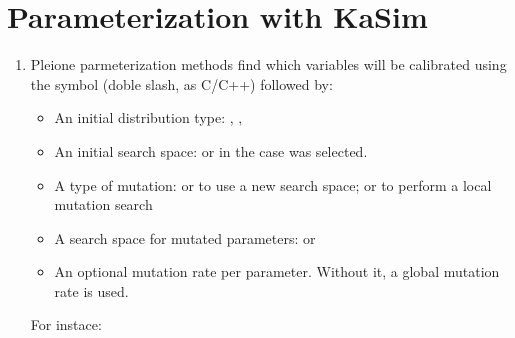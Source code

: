 \documentclass[letterpaper,10pt,english]{sphinxmanual}
\begin{document}
\section{Parameterization with KaSim}
\label{\detokenize{engines/kasim:parameterization-with-kasim}}\label{\detokenize{engines/kasim::doc}}\begin{enumerate}
\def\theenumi{\arabic{enumi}}
\def\labelenumi{\theenumi .}
\makeatletter\def\p@enumii{\p@enumi \theenumi .}\makeatother
\item {} 

Pleione parmeterization methods find which variables will be calibrated using
the symbol \sphinxcode{\sphinxupquote{//}} (doble slash, as C/C++) followed by:
\begin{itemize}
\item {} 
An initial distribution type: , , 

\item {} 
An initial search space:  or 
in the case  was selected.

\item {} 
A type of mutation:  or  to use a new search
space; or  to perform a local mutation search

\item {} 
A search space for mutated parameters:  or

\item {} 
An optional mutation rate per parameter. Without it, a global mutation
rate is used.

\end{itemize}

For instace:

\end{enumerate}
\end{document}
